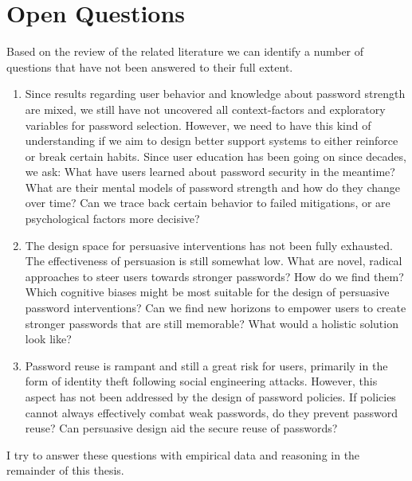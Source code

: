 \section*{Open Questions}
Based on the review of the related literature we can identify a number of questions that have not been answered to their full extent. 
\begin{enumerate}
	\item Since results regarding user behavior and knowledge about password strength are mixed, we still have not uncovered all context-factors and exploratory variables for password selection. However, we need to have this kind of understanding if we aim to design better support systems to either reinforce or break certain habits. Since user education has been going on since decades, we ask: What have users learned about password security in the meantime? What are their mental models of password strength and how do they change over time? Can we trace back certain behavior to failed mitigations, or are psychological factors more decisive?
	
	\item The design space for persuasive interventions has not been fully exhausted. The effectiveness of persuasion is still somewhat low. What are novel, radical approaches to steer users towards stronger passwords? How do we find them? Which cognitive biases might be most suitable for the design of persuasive password interventions? Can we find new horizons to empower users to create stronger passwords that are still memorable? What would a holistic solution look like?
	
	\item Password reuse is rampant and still a great risk for users, primarily in the form of identity theft following social engineering attacks. However, this aspect has not been addressed by the design of password policies. If policies cannot always effectively combat weak passwords, do they prevent password reuse? Can persuasive design aid the secure reuse of passwords?
\end{enumerate}

I try to answer these questions with empirical data and reasoning in the remainder of this thesis.


